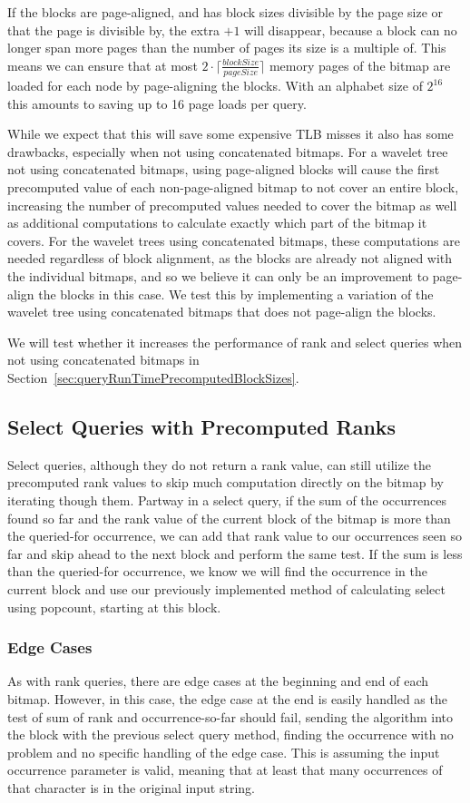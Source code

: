 If the blocks are page-aligned, and has block sizes divisible by the page size or that the page is divisible by, the extra $+1$ will disappear, because a block can no longer span more pages than the number of pages its size is a multiple of.
This means we can ensure that at most $2 \cdot \lceil\frac{blockSize}{pageSize}\rceil$ memory pages of the bitmap are loaded for each node by page-aligning the blocks.
With an alphabet size of $2^{16}$ this amounts to saving up to 16 page loads per query.

While we expect that this will save some expensive TLB misses it also has some drawbacks, especially when not using concatenated bitmaps.
For a wavelet tree not using concatenated bitmaps, using page-aligned blocks will cause the first precomputed value of each non-page-aligned bitmap to not cover an entire block, increasing the number of precomputed values needed to cover the bitmap as well as additional computations to calculate exactly which part of the bitmap it covers.
For the wavelet trees using concatenated bitmaps, these computations are needed regardless of block alignment, as the blocks are already not aligned with the individual bitmaps, and so we believe it can only be an improvement to page-align the blocks in this case.
We test this by implementing a variation of the wavelet tree using concatenated bitmaps that does not page-align the blocks.

We will test whether it increases the performance of rank and select queries when not using concatenated bitmaps in Section~\ref{sec:queryRunTimePrecomputedBlockSizes}.


\subsection{Select Queries with Precomputed Ranks}
Select queries, although they do not return a rank value, can still utilize the precomputed rank values to skip much computation directly on the bitmap by iterating though them.
Partway in a select query, if the sum of the occurrences found so far and the rank value of the current block of the bitmap is more than the queried-for occurrence, we can add that rank value to our occurrences seen so far and skip ahead to the next block and perform the same test.
If the sum is less than the queried-for occurrence, we know we will find the occurrence in the current block and use our previously implemented method of calculating select using popcount, starting at this block.


\subsubsection{Edge Cases}
As with rank queries, there are edge cases at the beginning and end of each bitmap.
However, in this case, the edge case at the end is easily handled as the test of sum of rank and occurrence-so-far should fail, sending the algorithm into the block with the previous select query method, finding the occurrence with no problem and no specific handling of the edge case.
This is assuming the input occurrence parameter is valid, meaning that at least that many occurrences of that character is in the original input string.

